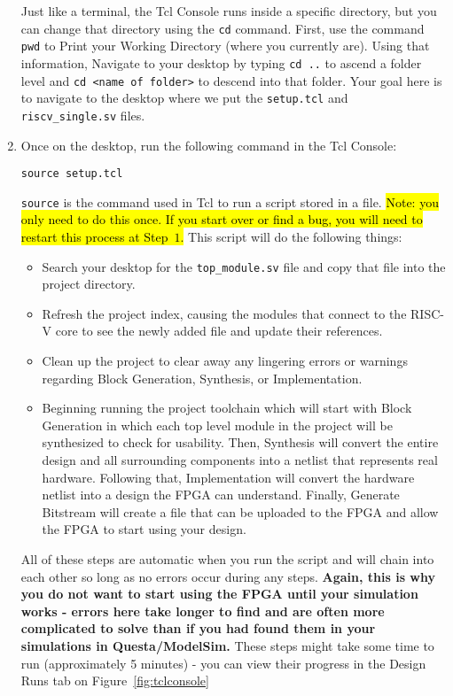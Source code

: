 \documentclass{article}
\begin{document}
\begin{enumerate}
Just like a terminal, the Tcl Console runs inside a specific directory, but you
can change that directory using the \verb|cd| command.  First, use the command
\verb|pwd| to Print your Working Directory (where you currently are).  Using
that information, Navigate to your desktop by typing \verb|cd ..| to
ascend a folder level and \verb|cd <name of folder>| to descend into that
folder.  Your goal here is to navigate to the desktop where we put the
\verb|setup.tcl| and \verb|riscv_single.sv| files.

\item Once on the desktop, run the following command in the Tcl Console:

\verb|source setup.tcl|

\verb|source| is the command used in Tcl to run a script stored in a file.
\hl{Note: you only need to do this once.  If you start over
  or find a bug, you will need to
  restart this process at Step~$1$.}  This
script will do the following things:
\begin{itemize}
\item Search your desktop for the \verb|top_module.sv| file and copy that
  file into the project directory.
	
\item Refresh the project index, causing the modules that connect to the
  RISC-V core to see the newly added file and update their references.
	
\item Clean up the project to clear away any lingering errors or warnings
  regarding Block Generation, Synthesis, or Implementation.
	
\item Beginning running the project toolchain which will start with Block
  Generation in which each top level module in the project will be
  synthesized to check for usability.  Then, Synthesis will convert the entire
  design and all surrounding components into a netlist
  that represents real hardware.  Following that, Implementation will convert
  the hardware netlist into a design the FPGA can understand.  Finally,
  Generate Bitstream will create a file that can be uploaded to the FPGA and
  allow the FPGA to start using your design.
\end{itemize}
All of these steps are automatic when you run the script and will chain into
each other so long as no errors occur during any steps.  \textbf{Again, this is
why you do not want to start using the FPGA until your simulation works - errors
here take longer to find and are often more complicated to solve than if you had
found them in your simulations in Questa/ModelSim.}  These steps might take some time to
run (approximately 5 minutes) - you can view their progress in the Design Runs
tab on Figure~\ref{fig:tclconsole}


\end{enumerate}
\end{document}
